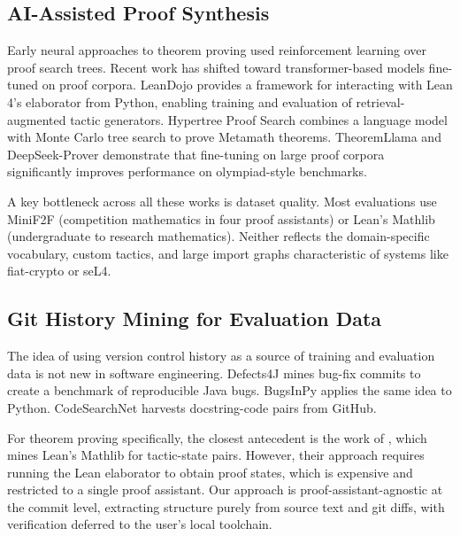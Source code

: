 \documentclass[11pt]{article}
\begin{document}
\subsection{AI-Assisted Proof Synthesis}

Early neural approaches to theorem proving \citep{bansal2019holist,paliwal2020graph} used reinforcement learning over proof search trees. Recent work has shifted toward transformer-based models fine-tuned on proof corpora. LeanDojo \citep{yang2023leandojo} provides a framework for interacting with Lean 4's elaborator from Python, enabling training and evaluation of retrieval-augmented tactic generators. Hypertree Proof Search \citep{lample2022hypertree} combines a language model with Monte Carlo tree search to prove Metamath theorems. TheoremLlama \citep{2023theoremllama} and DeepSeek-Prover \citep{xin2024deepseek} demonstrate that fine-tuning on large proof corpora significantly improves performance on olympiad-style benchmarks.

A key bottleneck across all these works is dataset quality. Most evaluations use MiniF2F \citep{zheng2021minif2f} (competition mathematics in four proof assistants) or Lean's Mathlib (undergraduate to research mathematics). Neither reflects the domain-specific vocabulary, custom tactics, and large import graphs characteristic of systems like fiat-crypto or seL4.

\subsection{Git History Mining for Evaluation Data}

The idea of using version control history as a source of training and evaluation data is not new in software engineering. Defects4J \citep{just2014defects4j} mines bug-fix commits to create a benchmark of reproducible Java bugs. BugsInPy \citep{widyasari2020bugsinpy} applies the same idea to Python. CodeSearchNet \citep{husain2019codesearchnet} harvests docstring-code pairs from GitHub.

For theorem proving specifically, the closest antecedent is the work of \citet{yang2023leandojo}, which mines Lean's Mathlib for tactic-state pairs. However, their approach requires running the Lean elaborator to obtain proof states, which is expensive and restricted to a single proof assistant. Our approach is proof-assistant-agnostic at the commit level, extracting structure purely from source text and git diffs, with verification deferred to the user's local toolchain.
\end{document}

